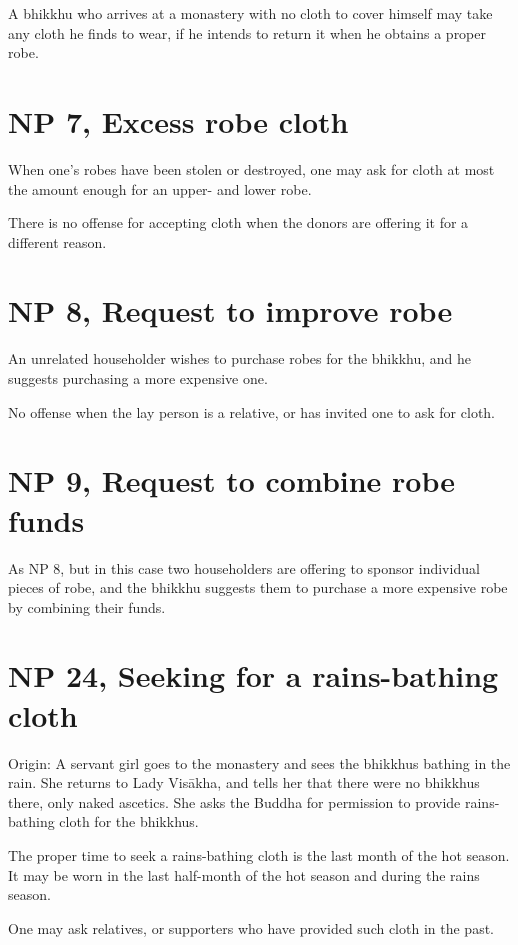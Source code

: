 A bhikkhu who arrives at a monastery with no cloth to cover himself may
take any cloth he finds to wear, if he intends to return it when he
obtains a proper robe.

\section{NP 7, Excess robe cloth}

When one's robes have been stolen or destroyed, one may ask for cloth at
most the amount enough for an upper- and lower robe.

There is no offense for accepting cloth when the donors are offering it
for a different reason.

\section{NP 8, Request to improve robe}

An unrelated householder wishes to purchase robes for the bhikkhu, and
he suggests purchasing a more expensive one.

No offense when the lay person is a relative, or has invited one to ask
for cloth.

\section{NP 9, Request to combine robe funds}

As NP 8, but in this case two householders are offering to sponsor
individual pieces of robe, and the bhikkhu suggests them to purchase a
more expensive robe by combining their funds.

\section{NP 24, Seeking for a rains-bathing cloth}

\enlargethispage{\baselineskip}

Origin: A servant girl goes to the monastery and sees the bhikkhus
bathing in the rain. She returns to Lady Visākha, and tells her that
there were no bhikkhus there, only naked ascetics. She asks the Buddha
for permission to provide rains-bathing cloth for the bhikkhus.

The proper time to seek a rains-bathing cloth is the last month of the
hot season. It may be worn in the last half-month of the hot season and
during the rains season.

One may ask relatives, or supporters who have provided such cloth in the
past.

